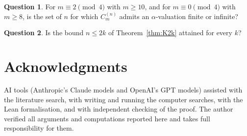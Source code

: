 \documentclass[11pt]{amsart}
\theoremstyle{definition}
\newtheorem{question}{Question}
\theoremstyle{remark}
\begin{document}
\begin{question}
For $m \equiv 2 \pmod 4$ with $m \ge 10$, and for $m \equiv 0 \pmod 4$ with $m \ge 8$, is the set of $n$ for which $C_m^{(n)}$ admits an $\alpha$-valuation finite or infinite?
\end{question}

\begin{question}
Is the bound $n \le 2k$ of Theorem~\ref{thm:K2k} attained for every $k$?
\end{question}

\section*{Acknowledgments}
AI tools (Anthropic's Claude models and OpenAI's GPT models) assisted with the literature search, with writing and running the computer searches, with the Lean formalisation, and with independent checking of the proof. The author verified all arguments and computations reported here and takes full responsibility for them.
\end{document}
